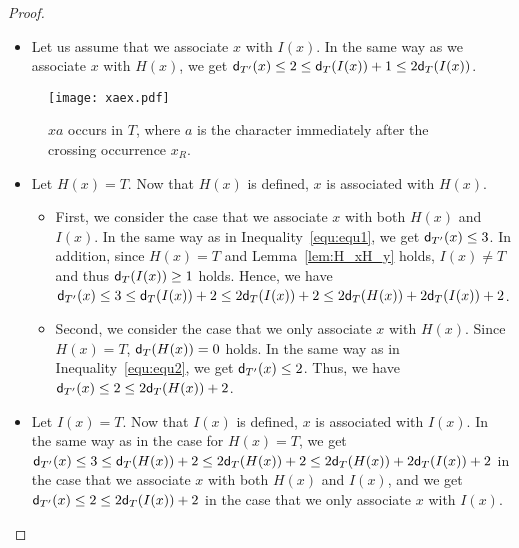 \begin{proof}
\begin{itemize}
\begin{itemize}
    \item
    Let us assume that we associate $x$ with $I(x)$. In the same way as we associate $x$ with $H(x)$, we get $\mathsf{d}_{T'}(x) \le 2 \le \mathsf{d}_{T}(I(x))+1 \le 2\mathsf{d}_{T}(I(x))$.
    \end{itemize}
    \end{itemize}

    \begin{figure}[H]
      \centering
      \texttt{[image: xaex.pdf]}
      \caption{$xa$ occurs in $T$, where $a$ is the character immediately after the crossing occurrence $x_R$.}
      \label{fig:xaex}
    \end{figure}
    

    \begin{itemize}
    \item
    Let $H(x) = T$. Now that $H(x)$ is defined, $x$ is associated with $H(x)$.
    \begin{itemize}
     \item First, we consider the case that we associate $x$ with both $H(x)$ and $I(x)$.
    In the same way as in Inequality~\ref{equ:equ1}, we get $\mathsf{d}_{T'}(x) \le 3$.
    In addition, since $H(x)=T$ and Lemma~\ref{lem:H_xH_y} holds, $I(x) \neq T$ and thus $\mathsf{d}_{T}(I(x)) \ge 1$ holds.
    Hence, we have $\mathsf{d}_{T'}(x) \le 3 \le \mathsf{d}_{T}(I(x))+2 \le 2\mathsf{d}_{T}(I(x))+2 \le 2\mathsf{d}_{T}(H(x))+2\mathsf{d}_{T}(I(x))+2$.
    \item Second, we consider the case that we only associate $x$ with $H(x)$.
    Since $H(x)=T$, $\mathsf{d}_{T}(H(x)) =0$ holds.
    In the same way as in Inequality~\ref{equ:equ2}, we get $\mathsf{d}_{T'}(x) \le 2$.
    Thus, we have $\mathsf{d}_{T'}(x) \le 2 \le 2\mathsf{d}_{T}(H(x))+2$.
    \end{itemize}

    \item
    Let $I(x) = T$. Now that $I(x)$ is defined, $x$ is associated with $I(x)$.
    In the same way as in the case for $H(x)=T$, 
    we get $\mathsf{d}_{T'}(x) \le 3 \le \mathsf{d}_{T}(H(x))+2 \le 2\mathsf{d}_{T}(H(x))+2 \le 2\mathsf{d}_{T}(H(x))+2\mathsf{d}_{T}(I(x))+2$ in the case that we associate $x$ with both $H(x)$ and $I(x)$,
    and we get $\mathsf{d}_{T'}(x) \le 2 \le 2\mathsf{d}_{T}(I(x))+2$ in the case that we only associate $x$ with $I(x)$.
   \end{itemize}


\end{proof}
